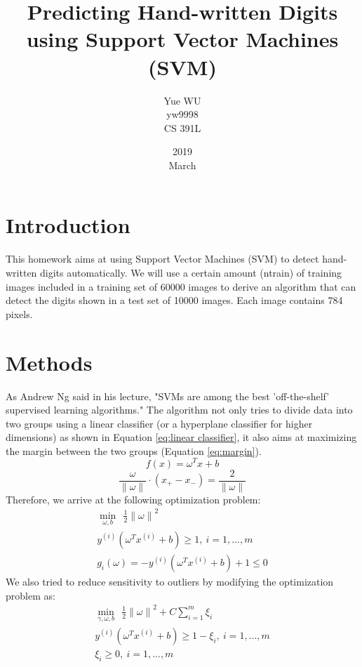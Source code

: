 \documentclass[UTF8,12pt]{article}
\title{Predicting Hand-written Digits using Support Vector Machines (SVM)}
\date{2019\\ March}
\author{Yue WU\\ yw9998\\CS 391L}
\begin{document}
	\maketitle
	\section{Introduction}
	This homework aims at using Support Vector Machines (SVM) to detect hand-written digits automatically. We will use a certain amount (ntrain) of training images included in a training set of 60000 images to derive an algorithm that can detect the digits shown in a test set of 10000 images. Each image contains 784 pixels.
	\section{Methods}
	As Andrew Ng said in his lecture, "SVMs are among the best 'off-the-shelf' supervised learning algorithms." The algorithm not only tries to divide data into two groups using a linear classifier (or a hyperplane classifier for higher dimensions) as shown in Equation \ref{eq:linear classifier}, it also aims at maximizing the margin between the two groups (Equation \ref{eq:margin}). 
	\begin{equation}
	\label{eq:linear classifier}
	f(x) = \omega^{T}x+b
	\end{equation}
	\begin{equation}
	\label{eq:margin}
	\frac{\omega }{\left \| \omega  \right \|}\cdot \left ( x_{+}-x_{-} \right )=\frac{2}{\left \| \omega \right \|}
	\end{equation}
	Therefore, we arrive at the following optimization problem:
	\begin{equation}
	\begin{split}
	\min_{\omega,b}\ \ \frac{1}{2}\left \| \omega  \right \|^{2}\\
	y^{(i)}(\omega ^{T}x^{(i)}+b)\geq 1,\ i=1,...,m\\
	g_{i}(\omega )=-y^{(i)}(\omega ^{T}x^{(i)}+b)+1\leq 0
	\end{split}
	\end{equation}
	We also tried to reduce sensitivity to outliers by modifying the optimization problem as:
	\begin{equation}
	\begin{split}
	\min_{\gamma,\omega,b}\ \ \frac{1}{2}\left \| \omega  \right \|^{2}+C\sum_{i=1}^{m}\xi _{i}\\y^{(i)}(\omega ^{T}x^{(i)}+b)\geq 1-\xi _{i},\ i=1,...,m\\\xi_{i}\geq 0, \ i=1,...,m
	\end{split}
	\end{equation}
\end{document}
